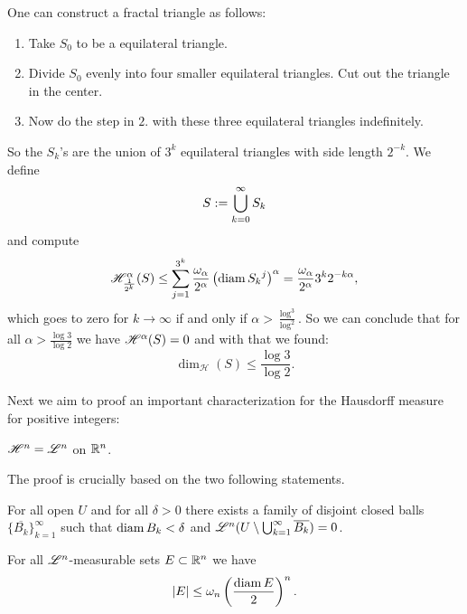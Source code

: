 \begin{remark}
One can construct a fractal triangle as follows: 

\begin{enumerate}[1.]
\item Take $S_0$ to be a equilateral
triangle. 
\item Divide $S_0$ evenly into four smaller equilateral
triangles. Cut out the triangle in the center.
\item Now do the step in $2.$ with these three equilateral triangles indefinitely.
\end{enumerate}

So the $S_k$'s are the 
union of $3^k$ equilateral triangles with side length $2^{-k}$. We define 
\[
S := \bigcup_{k=0}^\infty S_k
\vspace{-1em}
\]
and compute
\[
\mathscr{H}^{\alpha}_{\frac{1}{2^k}}(S) 
\leq \sum_{j=1}^{3^k}
\frac{\omega_\alpha}{2^\alpha} 
\left(\operatorname{diam} {S_k}^j\right)^\alpha 
= \frac{\omega_\alpha}{2^\alpha} 3^k 2^{-k\alpha},
\]
which goes to zero for $k\to \infty$ if and only if $\alpha >
\frac{\log^3}{\log^2}$.
So we can conclude that for all $\alpha > \frac{\log{3}}{\log{2}}$ we
have $\mathscr{H}^{\alpha}(S) = 0$ and with that we found:
\[
\dim_{\mathcal{H}}(S) \leq \frac{\log 3}{\log 2}.
\]
\end{remark}

Next we aim to proof an important characterization for the Hausdorff measure for
positive integers:

\begin{theorem}
\label{thmHeqL}
$\mathscr{H}^{n}= \mathscr{L}^{n}$ on $\mathbb{R}^n$.
\end{theorem}

The proof is crucially based on the two following statements.

\begin{lemma}
\label{lemmaVitaliCovering}
For all open $U$ and for all $\delta > 0$ there exists a family of disjoint
closed balls $\{\overline{B_k}\}_{k=1}^\infty$ such that $\operatorname{diam} B_k < \delta$ and
$\mathscr{L}^{n}(U \setminus \bigcup_{k=1}^\infty \overline{B_k}) = 0$.
\end{lemma}

\begin{theorem}
\label{thmIso}
For all $\mathscr{L}^{n}$-measurable sets $E \subset \mathbb{R}^n$ we have 
\[
|E| \leq \omega_n \left(\frac{\operatorname{diam} E}{2}\right)^n.
\]
\end{theorem}

